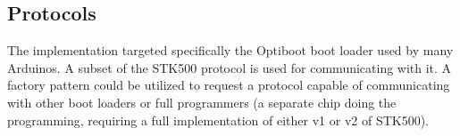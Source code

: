     \subsection{Protocols}
    The implementation targeted specifically the Optiboot boot loader used by many Arduinos. A subset of the STK500
    protocol is used for communicating with it. A factory pattern could be utilized to request a protocol capable of
    communicating with other boot loaders or full programmers (a separate chip doing the programming, requiring a
    full implementation of either v1 or v2 of STK500).
